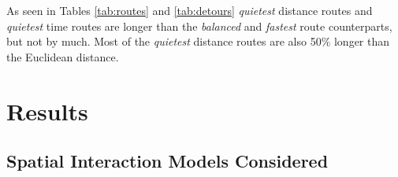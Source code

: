 \documentclass[smallextended]{svjour3}       %
\begin{document}
\begin{table}

\caption{\label{tab:unnamed-chunk-1}\label{tab:detours}Descriptive Statistics of Average Detour of Inferred Routes by CycleStreeets Compared to Euclidean Distance}
\centering
{}
\end{table}

As seen in Tables \ref{tab:routes} and \ref{tab:detours} \emph{quietest}
distance routes and \emph{quietest} time routes are longer than the
\emph{balanced} and \emph{fastest} route counterparts, but not by much.
Most of the \emph{quietest} distance routes are also 50\% longer than
the Euclidean distance.

\hypertarget{sec:results}{%
\section{Results}\label{sec:results}}

\hypertarget{spatial-interaction-models-considered}{%
\subsection{Spatial Interaction Models
Considered}\label{spatial-interaction-models-considered}}
\end{document}

